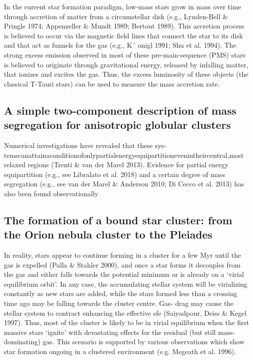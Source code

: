 \documentclass[../main.tex]{subfiles}
\begin{document}
In the current star formation paradigm, low-mass stars grow in
mass over time through accretion of matter from a circumstellar
disk (e.g., Lynden-Bell & Pringle 1974; Appenzeller & Mundt
1989; Bertout 1989). This accretion process is believed to occur
via the magnetic field lines that connect the star to its disk and
that act as funnels for the gas (e.g., K¨ onigl 1991; Shu et al.
1994). The strong excess emission observed in most of these
pre-main-sequence (PMS) stars is believed to originate through
gravitational energy, released by infalling matter, that ionizes
and excites the gas. Thus, the excess luminosity of these objects
(the classical T-Tauri stars) can be used to measure the mass
accretion rate.

\subsection{A simple two-component description of mass
	segregation for anisotropic globular clusters}


Numerical investigations have revealed that these sys-
temscanattainaconditionofonlypartialenergyequipartitionevenintheircentral,most
relaxed regions (Trenti & van der Marel 2013). Evidence for partial energy equipartition
(e.g., see Libralato et al. 2018) and a certain degree of mass segregation (e.g., see van der
Marel & Anderson 2010; Di Cecco et al. 2013) has also been found observationally

\subsection{The formation of a bound star cluster: from the Orion nebula cluster to the Pleiades}


In reality, stars appear to continue forming in a cluster for a few
Myr until the gas is expelled (Palla & Stahler 2000), and once a
star forms it decouples from the gas and either falls towards the
potential minimum or is already on a `virial equilibrium orbit'. In
any case, the accumulating stellar system will be virializing
constantly as new stars are added, while the stars formed less than a crossing time ago may be falling towards the cluster centre. Gas-
drag may cause the stellar system to contract enhancing the
effective sfe (Saiyadpour, Deiss & Kegel 1997). Thus, most of the
cluster is likely to be in virial equilibrium when the first massive
stars `ignite' with devastating effects for the residual (but still
mass-dominating) gas. This scenario is supported by various
observations which show star formation ongoing in a clustered
environment (e.g. Megeath et al. 1996).
\end{document}
